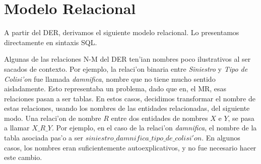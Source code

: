 \section{Modelo Relacional}

A partir del DER, derivamos el siguiente modelo relacional. Lo presentamos directamente en sintaxis SQL.

Algunas de las relaciones N-M del DER ten'ian nombres poco ilustrativos al ser sacados de contexto. Por ejemplo, la relaci'on binaria entre \textit{Siniestro} y \textit{Tipo de Colisi'on} fue llamada \textit{damnifica}, nombre que no tiene mucho sentido aisladamente. Esto representaba un problema, dado que en, el MR, esas relaciones pasan a ser tablas. En estos casos, decidimos transformar el nombre de estas relaciones, usando los nombres de las entidades relacionadas, del siguiente modo. Una relaci'on de nombre $R$ entre dos entidades de nombres $X$ e $Y$, se pasa a llamar $X\_R\_Y$. Por ejemplo, en el caso de la relaci'on \textit{damnifica}, el nombre de la tabla asociada pas'o a ser $siniestro\_damnifica\_tipo\_de\_colisi'on$. En algunos casos, los nombres eran suficientemente autoexplicativos, y no fue necesario hacer este cambio.

